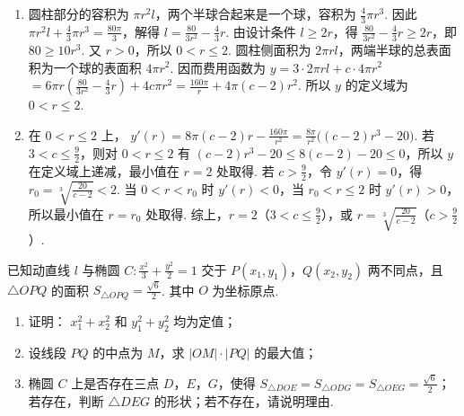 \begin{solution}
\begin{enumerate}
\item 圆柱部分的容积为 \(\pi r^2l\)，两个半球合起来是一个球，容积为 \(\frac43\pi r^3\). 因此
\(\pi r^2l+\frac43\pi r^3=\frac{80\pi}{3}\)，解得
\(l=\frac{80}{3r^2}-\frac43r\).
由设计条件 \(l\geqslant2r\)，得
\(\frac{80}{3r^2}-\frac43r\geqslant2r\)，即 \(80\geqslant10r^3\). 又 \(r>0\)，所以 \(0<r\leqslant2\).
圆柱侧面积为 \(2\pi rl\)，两端半球的总表面积为一个球的表面积 \(4\pi r^2\). 因而费用函数为
\(y=3\cdot2\pi rl+c\cdot4\pi r^2\)
\(=6\pi r\left(\frac{80}{3r^2}-\frac43r\right)+4c\pi r^2
=\frac{160\pi}{r}+4\pi(c-2)r^2\).
所以 \(y\) 的定义域为 \(0<r\leqslant2\).
\item 在 \(0<r\leqslant2\) 上，
\(y'(r)=8\pi(c-2)r-\frac{160\pi}{r^2}
=\frac{8\pi}{r^2}\bigl((c-2)r^3-20\bigr)\).
若 \(3<c\leqslant\frac92\)，则对 \(0<r\leqslant2\) 有
\((c-2)r^3-20\leqslant8(c-2)-20\leqslant0\)，所以 \(y\) 在定义域上递减，最小值在 \(r=2\) 处取得.
若 \(c>\frac92\)，令 \(y'(r)=0\)，得
\(r_0=\sqrt[3]{\frac{20}{c-2}}<2\). 当 \(0<r<r_0\) 时 \(y'(r)<0\)，当 \(r_0<r\leqslant2\) 时 \(y'(r)>0\)，所以最小值在 \(r=r_0\) 处取得.
综上，\(r=2\)（\(3<c\leqslant\frac92\)），或
\(r=\sqrt[3]{\frac{20}{c-2}}\)（\(c>\frac92\)）.
\end{enumerate}
\end{solution}

\begin{problem}
已知动直线 \(l\) 与椭圆 \(C: \frac{x^2}{3} + \frac{y^2}{2} = 1\) 交于 \(P(x_1, y_1)\)，\(Q(x_2, y_2)\) 两不同点，且 \(\triangle OPQ\) 的面积 \(S_{\triangle OPQ} = \frac{\sqrt{6}}{2}\). 其中 \(O\) 为坐标原点.
\begin{enumerate}
\item 证明： \(x_1^2 + x_2^2\) 和 \(y_1^2 + y_2^2\) 均为定值；
\item 设线段 \(PQ\) 的中点为 \(M\)，求 \(|OM| \cdot |PQ|\) 的最大值；
\item 椭圆 \(C\) 上是否存在三点 \(D\)，\(E\)，\(G\)，使得 \(S_{\triangle DOE} = S_{\triangle ODG} = S_{\triangle OEG} = \frac{\sqrt{6}}{2}\)；若存在，判断 \(\triangle DEG\) 的形状；若不存在，请说明理由.
\end{enumerate}
\end{problem}


